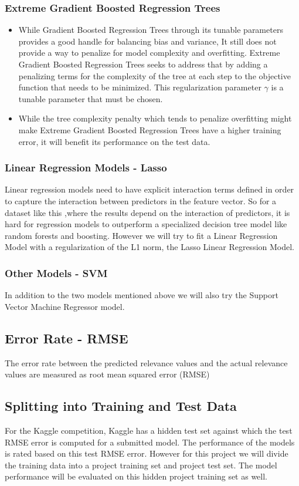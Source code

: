 \documentclass[twoside,12pt]{article}
\begin{document}
\subsubsection{Extreme Gradient Boosted Regression Trees}
\begin{itemize}
	\item
	While  Gradient Boosted Regression Trees through its tunable parameters provides a good handle for balancing bias and variance, It still does not provide a way to penalize for model complexity and overfitting. Extreme Gradient Boosted Regression Trees seeks to address that by adding a penalizing terms for the complexity of the tree at each step to the objective function that needs to be minimized. This regularization parameter $\gamma$ is a tunable parameter that must be chosen.
	\item
	While the tree complexity penalty which tends to penalize overfitting might make Extreme Gradient Boosted Regression Trees have a higher training error, it will benefit its performance on the test data.
\end{itemize}

\subsubsection{Linear Regression Models - Lasso}
Linear regression models need to have explicit interaction terms defined in order to capture the interaction between predictors in the feature vector. So for a dataset like this ,where the results depend on the interaction of predictors, it is hard for regression models to outperform a specialized decision tree model like random forests and boosting. However we will try to fit a Linear Regression Model with a regularization of the L1 norm, the Lasso Linear Regression Model.

\subsubsection{Other Models - SVM}
In addition to the two models mentioned above we will also try the Support Vector Machine Regressor model.

\subsection{Error Rate - RMSE}
The error rate between the predicted relevance values and the actual relevance values are measured as root mean squared error (RMSE)

\subsection{Splitting into Training and Test Data}
For the Kaggle competition, Kaggle has a hidden test set against which the test RMSE error is computed for a submitted model. The performance of the models is rated based on this test RMSE error. However for this project we will divide the training data into a project training set and project test set. The model performance will be evaluated on this  hidden project training set as well.
\end{document}
